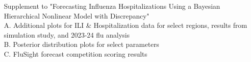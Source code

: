 \documentclass[ba]{imsart}
\theoremstyle{plain}
\theoremstyle{definition}
\theoremstyle{remark}
\begin{document}
% 
% 

\begin{supplement}
Supplement to "Forecasting Influenza Hospitalizations Using a
Bayesian Hierarchical Nonlinear Model with
Discrepancy"\\
A. Additional plots for ILI \& Hospitalization data for select regions, results 
from simulation study, and 2023-24 flu analysis\\
B. Posterior distribution plots for select parameters\\
C. FluSight forecast competition scoring results
\end{supplement}




\end{document}
